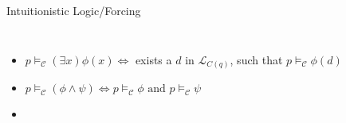 \documentclass{beamer}
\begin{document}
\begin{frame}{Intuitionistic Logic/Forcing}
\begin{columns}
{\begin{itemize}
\item    \textcolor{black!30}{$ p \vDash_{\mathcal{C}} (\exists x) \phi(x)  \Leftrightarrow $  exists a $d$ in  $\mathcal{L}_{C(q)}$, such that $p \vDash_{\mathcal{C}} \phi(d)$}\\

\item    \textcolor{black!30}{$ p \vDash_{\mathcal{C}} (\phi \land \psi)    \Leftrightarrow p \vDash_{\mathcal{C}} \phi \text{ and } p \vDash_{\mathcal{C}} \psi$}\\

\item    \textbf{}\\


    \end{itemize}
}


    \rule{0.2mm}{\textheight} %

    \forcingExampleiIII
    

\end{columns}
\end{frame}
\end{document}
